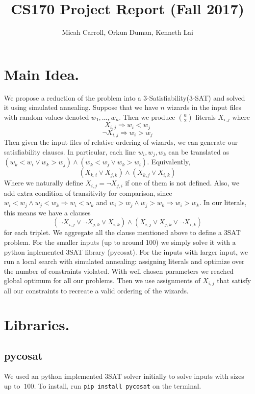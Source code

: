 \documentclass{article}
\theoremstyle{plain}
\numberwithin{theorem}{subsection}
\theoremstyle{definition}
\numberwithin{equation}{subsection}
\begin{document}
\title{CS170 Project Report (Fall 2017)}
\author{Micah Carroll, Orkun Duman, Kenneth Lai}
\maketitle
\tableofcontents
\eject
\section{Main Idea.} We propose a reduction of the problem into a 3-Satisfiability(3-SAT) and solved it using simulated annealing. Suppose that we have $n$ wizards in the input files with random values denoted $w_1, \dots, w_n$. Then we produce ${n \choose 2}$ literals $X_{i, j}$ where \[X_{i, j} \Rightarrow w_i < w_j\] \[\neg X_{i, j} \Rightarrow w_i > w_j\] Then given the input files of relative ordering of wizards, we can generate our satisfiability clauses. In particular, each line $w_i, w_j, w_k$ can be translated as $(w_k < w_i \vee w_k > w_j) \wedge (w_k < w_j \vee w_k > w_i)$. Equivalently, \[(X_{k, i} \vee X_{j, k}) \wedge (X_{k, j} \vee X_{i, k})\] Where we naturally define $X_{i, j} = \neg X_{j, i}$ if one of them is not defined. Also, we add extra condition of transitivity for comparison, since $w_i < w_j \wedge w_j < w_k \Rightarrow w_i < w_k$ and $w_i > w_j \wedge w_j > w_k \Rightarrow w_i > w_k$. In our literals, this means we have a clauses \[(\neg X_{i, j} \vee \neg X_{j, k} \vee X_{i, k}) \wedge (X_{i, j} \vee  X_{j, k} \vee \neg X_{i, k})\]for each triplet. We aggregate all the clause mentioned above to define a 3SAT problem. For the smaller inputs (up to around 100) we simply solve it with a python inplemented 3SAT library (pycosat). For the inputs with larger input, we run a local search with simulated annealing: assigning literals and optimize over the number of constraints violated. With well chosen parameters we reached global optimum for all our problems. Then we use assignments of $X_{i, j}$ that satisfy all our constraints to recreate a valid ordering of the wizards.

\section{Libraries.}
\subsection{pycosat} We used an python implemented 3SAT solver initially to solve inputs with sizes up to $~100$. To install, run \texttt{pip install pycosat} on the terminal. 
\end{document}
